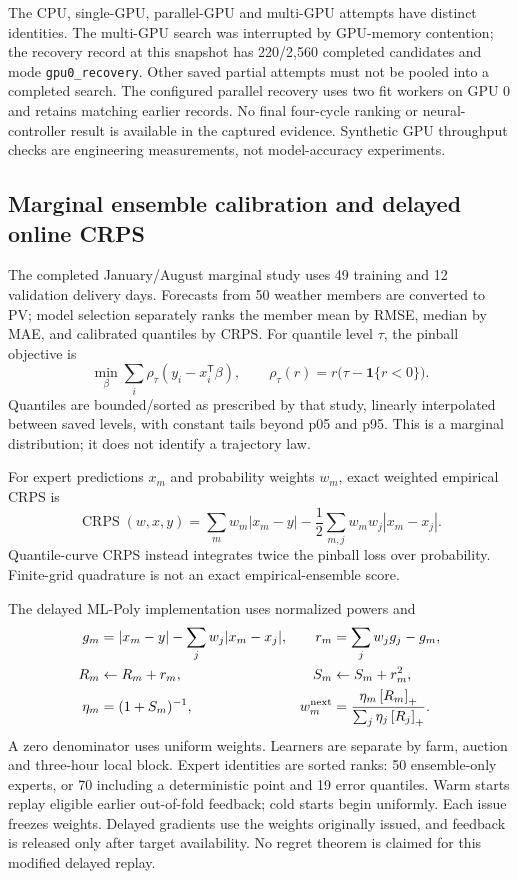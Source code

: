 The CPU, single-GPU, parallel-GPU and multi-GPU attempts have distinct identities.
The multi-GPU search was interrupted by GPU-memory contention; the recovery
record at this snapshot has 220/2,560 completed candidates and mode
\texttt{gpu0\_recovery}. Other saved partial attempts must not be pooled into a
completed search. The configured parallel recovery uses two fit workers on
GPU 0 and retains matching earlier records. No final four-cycle ranking or
neural-controller result is available in the captured evidence. Synthetic GPU
throughput checks are engineering measurements, not model-accuracy experiments.

\subsection{Marginal ensemble calibration and delayed online CRPS}
The completed January/August marginal study uses 49 training and 12 validation
delivery days. Forecasts from 50 weather members are converted to PV; model
selection separately ranks the member mean by RMSE, median by MAE, and calibrated
quantiles by CRPS. For quantile level $\tau$, the pinball objective is
\begin{equation}
 \min_\beta\sum_i \rho_\tau(y_i-x_i^{\mathsf T}\beta),
 \qquad \rho_\tau(r)=r\bigl(\tau-\mathbf1\{r<0\}\bigr).
\end{equation}
Quantiles are bounded/sorted as prescribed by that study, linearly interpolated
between saved levels, with constant tails beyond p05 and p95. This is a
marginal distribution; it does not identify a trajectory law.

For expert predictions $x_m$ and probability weights $w_m$, exact weighted
empirical CRPS is
\begin{equation}\label{eq:weighted-crps}
 \operatorname{CRPS}(w,x,y)=\sum_m w_m|x_m-y|
 -\frac12\sum_{m,j}w_mw_j|x_m-x_j|.
\end{equation}
Quantile-curve CRPS instead integrates twice the pinball loss over probability.
Finite-grid quadrature is not an exact empirical-ensemble score.

The delayed ML-Poly implementation uses normalized powers and
\begin{align}
 g_m&=|x_m-y|-\sum_jw_j|x_m-x_j|,&
 r_m&=\sum_jw_jg_j-g_m,\\
 R_m&\leftarrow R_m+r_m,&S_m&\leftarrow S_m+r_m^2,\\
 \eta_m&=(1+S_m)^{-1},&
 w_m^{\rm next}&=\frac{\eta_m\left[R_m\right]_+}{\sum_j\eta_j\left[R_j\right]_+}.
\end{align}
A zero denominator uses uniform weights. Learners are separate by farm,
auction and three-hour local block. Expert identities are sorted ranks: 50
ensemble-only experts, or 70 including a deterministic point and 19 error
quantiles. Warm starts replay eligible earlier out-of-fold feedback; cold
starts begin uniformly. Each issue freezes weights. Delayed gradients use the
weights originally issued, and feedback is released only after target
availability. No regret theorem is claimed for this modified delayed replay.

